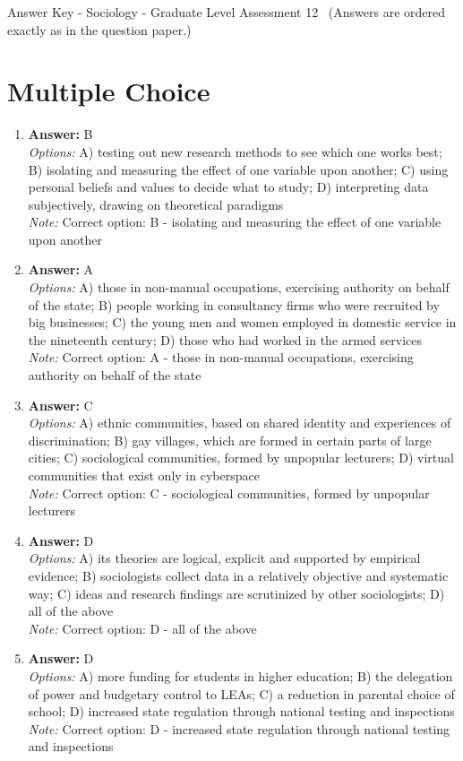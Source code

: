 \documentclass[12pt]{article}
\begin{document}
\begin{center}
Answer Key - Sociology - Graduate Level Assessment 12 \
\small (Answers are ordered exactly as in the question paper.)
\end{center}

\section*{Multiple Choice}
\begin{enumerate}[label=\arabic*.]
\item \textbf{Answer:} B
\\ \textit{Options:} A) testing out new research methods to see which one works best; B) isolating and measuring the effect of one variable upon another; C) using personal beliefs and values to decide what to study; D) interpreting data subjectively, drawing on theoretical paradigms
\\ \textit{Note:} Correct option: B - isolating and measuring the effect of one variable upon another
\item \textbf{Answer:} A
\\ \textit{Options:} A) those in non-manual occupations, exercising authority on behalf of the state; B) people working in consultancy firms who were recruited by big businesses; C) the young men and women employed in domestic service in the nineteenth century; D) those who had worked in the armed services
\\ \textit{Note:} Correct option: A - those in non-manual occupations, exercising authority on behalf of the state
\item \textbf{Answer:} C
\\ \textit{Options:} A) ethnic communities, based on shared identity and experiences of discrimination; B) gay villages, which are formed in certain parts of large cities; C) sociological communities, formed by unpopular lecturers; D) virtual communities that exist only in cyberspace
\\ \textit{Note:} Correct option: C - sociological communities, formed by unpopular lecturers
\item \textbf{Answer:} D
\\ \textit{Options:} A) its theories are logical, explicit and supported by empirical evidence; B) sociologists collect data in a relatively objective and systematic way; C) ideas and research findings are scrutinized by other sociologists; D) all of the above
\\ \textit{Note:} Correct option: D - all of the above
\item \textbf{Answer:} D
\\ \textit{Options:} A) more funding for students in higher education; B) the delegation of power and budgetary control to LEAs; C) a reduction in parental choice of school; D) increased state regulation through national testing and inspections
\\ \textit{Note:} Correct option: D - increased state regulation through national testing and inspections
\end{enumerate}
\end{document}
